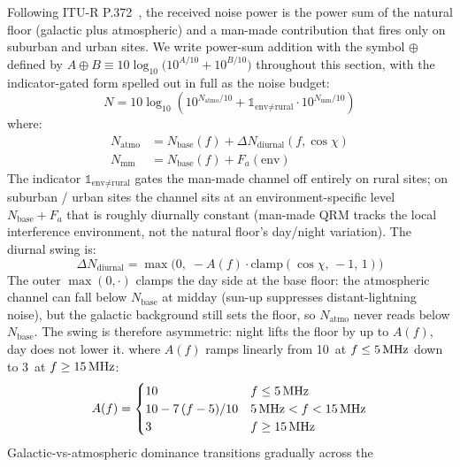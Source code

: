 \documentclass[11pt,a4paper]{article}
\newcommand{\SI}[2]{#1\,\text{#2}}
\newcommand{\dB}{\text{dB}}
\newcommand{\MHz}{\text{MHz}}
\begin{document}
Following ITU-R P.372~\cite{itup372}, the received noise power is
the power sum of the natural floor (galactic plus atmospheric)
and a man-made contribution that fires only on suburban and
urban sites.  We write power-sum addition with the symbol
$\oplus$ defined by $A \oplus B \equiv 10\log_{10}\!\bigl(
10^{A/10} + 10^{B/10}\bigr)$ throughout this section, with the
indicator-gated form spelled out in full as the noise budget:
\begin{equation}\label{eq:noise}
  N = 10\log_{10}\!\left(10^{N_{\text{atmo}}/10}
                       + \mathbb{1}_{\text{env}\ne\text{rural}}\cdot
                         10^{N_{\text{mm}}/10}\right)
\end{equation}
where:
\begin{align}
  N_{\text{atmo}} &= N_{\text{base}}(f) + \Delta N_{\text{diurnal}}(f,\cos\chi) \\
  N_{\text{mm}}   &= N_{\text{base}}(f) + F_a(\text{env})
\end{align}
The indicator $\mathbb{1}_{\text{env}\ne\text{rural}}$ gates the
man-made channel off entirely on rural sites; on suburban / urban
sites the channel sits at an environment-specific level
$N_{\text{base}} + F_a$ that is roughly diurnally constant (man-made
QRM tracks the local interference environment, not the natural
floor's day/night variation).  The diurnal swing is:
\begin{equation}
  \Delta N_{\text{diurnal}} = \max\bigl(0,\;
    -A(f) \cdot \text{clamp}(\cos\chi,\,-1,\,1)\bigr)
\end{equation}
The outer $\max(0, \cdot)$ clamps the day side at the base floor:
the atmospheric channel can fall below $N_{\text{base}}$ at midday
(sun-up suppresses distant-lightning noise), but the galactic
background still sets the floor, so $N_{\text{atmo}}$ never reads
below $N_{\text{base}}$.  The swing is therefore asymmetric:
night lifts the floor by up to $A(f)$, day does not lower it.
where $A(f)$ ramps linearly from \SI{10}{\dB} at $f \leq \SI{5}{\MHz}$
down to \SI{3}{\dB} at $f \geq \SI{15}{\MHz}$:
\begin{equation}
  A(f) = \begin{cases}
    10 & f \le \SI{5}{\MHz} \\
    10 - 7\,(f - 5)/10 & \SI{5}{\MHz} < f < \SI{15}{\MHz} \\
    3  & f \ge \SI{15}{\MHz}
  \end{cases}
\end{equation}
Galactic-vs-atmospheric dominance transitions gradually across the
\end{document}
